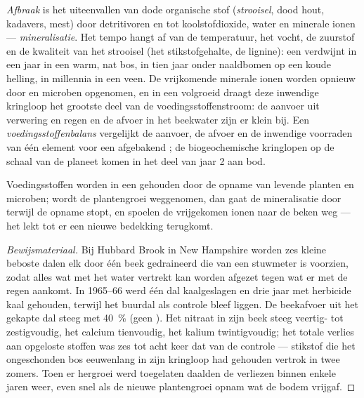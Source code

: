 \begin{definition}\label{def:b1:ecosystem-dynamics:decomposition}
\emph{Afbraak} is het uiteenvallen van dode organische stof
(\emph{strooisel}, dood hout, kadavers, mest) door detritivoren en
 tot koolstofdioxide, water en minerale ionen ---
\emph{mineralisatie}. Het tempo hangt af van de temperatuur, het vocht, de
zuurstof en de kwaliteit van het strooisel (het stikstofgehalte, de
lignine): een  verdwijnt in een jaar in een warm, nat bos, in tien jaar
onder naaldbomen op een koude helling, in millennia in een veen. De vrijkomende
minerale ionen worden opnieuw door  en microben opgenomen, en in een
volgroeid  draagt deze inwendige kringloop het grootste deel van de
voedingsstoffenstroom: de aanvoer uit verwering en regen en de afvoer in het
beekwater zijn er klein bij. Een \emph{voedingsstoffenbalans} vergelijkt de
aanvoer, de afvoer en de inwendige voorraden van één element voor een
afgebakend ; de biogeochemische kringlopen op de schaal van de
planeet komen in het deel van jaar 2 aan bod.
\end{definition}

\begin{proposition}\label{prop:b1:ecosystem-dynamics:retention}
Voedingsstoffen worden in een  gehouden door de opname van levende
planten en microben; wordt de plantengroei weggenomen, dan gaat de
mineralisatie door terwijl de opname stopt, en spoelen de vrijgekomen ionen
naar de beken weg --- het  lekt tot er een nieuwe bedekking
terugkomt.
\end{proposition}
\begin{proof}[Bewijsmateriaal]
Bij Hubbard Brook in New Hampshire worden zes kleine beboste dalen elk door
één beek gedraineerd die van een stuwmeter is voorzien, zodat alles wat met
het water vertrekt kan worden afgezet tegen wat er met de regen aankomt. In
1965--66 werd één dal kaalgeslagen en drie jaar met herbicide kaal gehouden,
terwijl het buurdal als controle bleef liggen. De beekafvoer uit het gekapte
dal steeg met \qty{40}{\%} (geen ). Het nitraat in zijn beek
steeg veertig- tot zestigvoudig, het calcium tienvoudig, het kalium
twintigvoudig; het totale verlies aan opgeloste stoffen was zes tot acht keer
dat van de controle --- stikstof die het ongeschonden bos eeuwenlang in zijn
kringloop had gehouden vertrok in twee zomers. Toen er hergroei werd
toegelaten daalden de verliezen binnen enkele jaren weer, even snel als de
nieuwe plantengroei opnam wat de bodem vrijgaf.
\end{proof}

